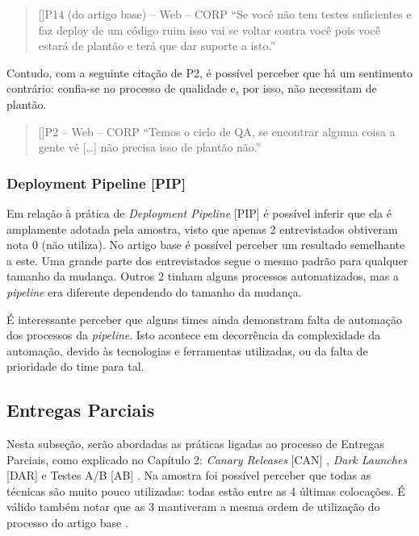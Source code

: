 \begin{quotation}[]{P14 (do artigo base) -- Web -- CORP}
    ``Se você não tem testes suficientes e faz deploy de um código ruim isso vai se voltar contra você pois você estará de plantão e terá que dar suporte a isto.''
\end{quotation}

Contudo, com a seguinte citação de P2, é possível perceber que há um sentimento contrário: confia-se no processo de qualidade e, por isso, não necessitam de plantão.

\vspace{5mm}

\begin{quotation}[]{P2 -- Web -- CORP}
    ``Temos o ciclo de QA, se encontrar alguma coisa a gente vê […] não precisa isso de plantão não.''
\end{quotation}

\subsubsection{Deployment Pipeline [PIP]}

Em relação à prática de \emph{Deployment Pipeline} [PIP] é possível inferir que ela é amplamente adotada pela amostra, visto que apenas 2 entrevistados obtiveram nota 0 (não utiliza). No artigo base é possível perceber um resultado semelhante a este. Uma grande parte dos entrevistados segue o mesmo padrão para qualquer tamanho da mudança. Outros 2 tinham alguns processos automatizados, mas a \emph{pipeline} era diferente dependendo do tamanho da mudança.

É interessante perceber que alguns times ainda demonstram falta de automação dos processos da \emph{pipeline}. Isto acontece em decorrência da complexidade da automação, devido às tecnologias e ferramentas utilizadas, ou da falta de prioridade do time para tal.
 
\subsection{Entregas Parciais}

Nesta subseção, serão abordadas as práticas ligadas ao processo de Entregas Parciais, como explicado no Capítulo 2: \emph{Canary Releases} [CAN] \cite{continuousDeliveryBook}, \emph{Dark Launches} [DAR] \cite{devAndDeploymentFB} e Testes A/B [AB] \cite{testsAB}. Na amostra foi possível perceber que todas as técnicas são muito pouco utilizadas: todas estão entre as 4 últimas colocações. É válido também notar que as 3 mantiveram a mesma ordem de utilização do processo do artigo base \cite{empiricalStudy2016}.

